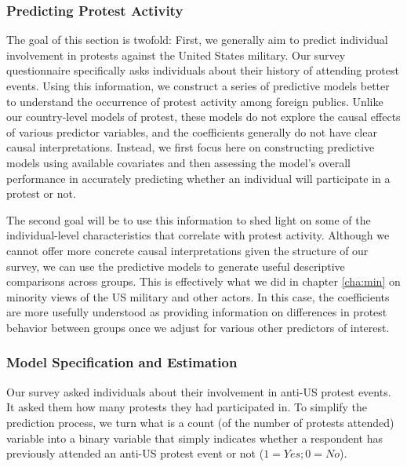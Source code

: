 			
			
			\subsubsection*{Predicting Protest Activity}
			
			The goal of this section is twofold: First, we generally aim to predict individual involvement in protests against the United States military. Our survey questionnaire specifically asks individuals about their history of attending protest events. Using this information, we construct a series of predictive models better to understand the occurrence of protest activity among foreign publics. Unlike our country-level models of protest, these models do not explore the causal effects of various predictor variables, and the coefficients generally do not have clear causal interpretations. Instead, we first focus here on constructing predictive models using available covariates and then assessing the model's overall performance in accurately predicting whether an individual will participate in a protest or not. 
			
			The second goal will be to use this information to shed light on some of the individual-level characteristics that correlate with protest activity. Although we cannot offer more concrete causal interpretations given the structure of our survey, we can use the predictive models to generate useful descriptive comparisons across groups. This is effectively what we did in chapter \ref{cha:min} on minority views of the US military and other actors. In this case, the coefficients are more usefully understood as providing information on differences in protest behavior between groups once we adjust for various other predictors of interest.
			
			\subsubsection*{Model Specification and Estimation}
			
			
			Our survey asked individuals about their involvement in anti-US protest events. It asked them how many protests they had participated in. To simplify the prediction process, we turn what is a count (of the number of protests attended) variable into a binary variable that simply indicates whether a respondent has previously attended an anti-US protest event or not ($1 = Yes; 0 = No$). 
			
